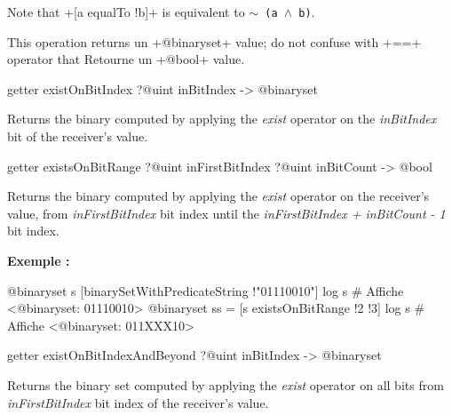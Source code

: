Note that \ggs+[a equalTo !b]+ is equivalent to \texttt{$\sim$ (a $\wedge$ b)}.

This operation returns un \ggs+@binaryset+ value; do not confuse with \ggs+==+ operator that Retourne un \ggs+@bool+ value.








\begin{galgasbox}
getter existOnBitIndex ?@uint inBitIndex -> @binaryset
\end{galgasbox}

Returns the binary computed by applying the \emph{exist} operator on the \emph{inBitIndex} bit of the receiver's value.







\begin{galgasbox}
getter existsOnBitRange ?@uint inFirstBitIndex ?@uint inBitCount -> @bool
\end{galgasbox}


Returns the binary computed by applying the \emph{exist} operator on the receiver's value, from \emph{inFirstBitIndex} bit index until the \emph{inFirstBitIndex + inBitCount - 1} bit index.


\textbf{Exemple :}
\begin{galgas}
@binaryset s [binarySetWithPredicateString !"01110010"]
log s # Affiche <@binaryset: 01110010>
@binaryset ss = [s existsOnBitRange !2 !3]
log s # Affiche <@binaryset: 011XXX10>
\end{galgas}








\begin{galgasbox}
getter existOnBitIndexAndBeyond ?@uint inBitIndex -> @binaryset
\end{galgasbox}

Returns the binary set computed by applying the \emph{exist} operator on all bits from \emph{inFirstBitIndex} bit index of the receiver's value.







